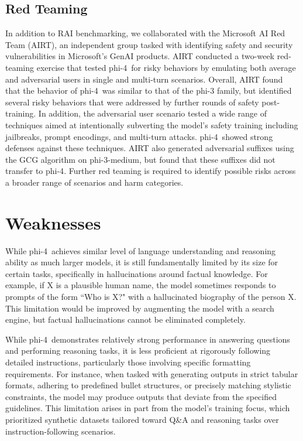\documentclass[11pt]{article}
\newcommand{\modelwithoutspace}{\textsf{phi-4}}
\newcommand{\model}{\modelwithoutspace~}
\newcommand{\phithree}{\textsf{phi-3}}
\newcommand{\phithreemed}{\textsf{phi-3-medium}}
\begin{document}
\subsection{Red Teaming}

In addition to RAI benchmarking, we collaborated with the Microsoft AI Red Team (AIRT), an independent group tasked with identifying safety and security vulnerabilities in Microsoft's GenAI products. AIRT conducted a two-week red-teaming exercise that tested \model for risky behaviors by emulating both average and adversarial users in single and multi-turn scenarios. Overall, AIRT found that the behavior of \model was similar to that of the \phithree{} family, but identified several risky behaviors that were addressed by further rounds of safety post-training. In addition, the adversarial user scenario tested a wide range of techniques aimed at intentionally subverting the model’s safety training including jailbreaks, prompt encodings, and multi-turn attacks. \model showed strong defenses against these techniques. AIRT also generated adversarial suffixes using the GCG algorithm \cite{zou2023universaltransferableadversarialattacks} on \phithreemed, but found that these suffixes did not transfer to \modelwithoutspace. Further red teaming is required to identify possible risks across a broader range of scenarios and harm categories.

\section{Weaknesses}
While \model achieves similar level of language understanding and reasoning ability as much larger models, it is still fundamentally limited by its size for certain tasks, specifically in hallucinations around factual knowledge. For example, if X is a plausible human name, the model sometimes responds to prompts of the form ``Who is X?" with a hallucinated biography of the person X.   This limitation would be improved by augmenting the model with a search engine, but factual hallucinations cannot be eliminated completely.

While \model demonstrates relatively strong performance in answering questions and performing reasoning tasks, it is less proficient at rigorously following detailed instructions, particularly those involving specific formatting requirements. For instance, when tasked with generating outputs in strict tabular formats, adhering to predefined bullet structures, or precisely matching stylistic constraints, the model may produce outputs that deviate from the specified guidelines. This limitation arises in part from the model’s training focus, which prioritized synthetic datasets tailored toward Q\&A and reasoning tasks over instruction-following scenarios.
\end{document}
